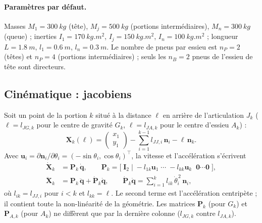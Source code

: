 \documentclass[11pt,a4paper]{article}
\newcommand{\vect}[1]{\bm{#1}}
\newcommand{\mat}[1]{\bm{#1}}
\newcommand{\T}{^{\!\top}}
\newcommand{\dt}[1]{\dot{#1}}
\newcommand{\ddt}[1]{\ddot{#1}}
\newcommand{\q}{\vect{q}}
\begin{document}
\paragraph{Paramètres par défaut.} Masses $M_1=\SI{300}{kg}$ (tête), $M_j=\SI{500}{kg}$ (portions intermédiaires), $M_n=\SI{300}{kg}$ (queue) ; inerties $I_1=\SI{170}{kg.m^2}$, $I_j=\SI{150}{kg.m^2}$, $I_n=\SI{100}{kg.m^2}$ ; longueur $L=\SI{1,8}{m}$, $l_1=\SI{0,6}{m}$, $l_n=\SI{0,3}{m}$. Le nombre de pneus par essieu est $n_P=2$ (têtes) et $n_P=4$ (portions intermédiaires) ; seuls les $n_B=2$ pneus de l'essieu de tête sont directeurs.

\subsection{Cinématique : jacobiens}\label{sec:jac}
Soit un point de la portion $k$ situé à la distance $\ell$ en arrière de l'articulation $J_k$ ($\ell=l_{JG,k}$ pour le centre de gravité $G_k$, $\ell=l_{JA,k}$ pour le centre d'essieu $A_k$) :
\begin{equation}
 \vect X_k(\ell)=\begin{pmatrix}x_1\\y_1\end{pmatrix}-\sum_{i=1}^{k-1}l_{JJ,i}\,\vect n_i-\ell\,\vect n_k .
\end{equation}
Avec $\vect u_i=\partial\vect n_i/\partial\theta_i=(-\sin\theta_i,\cos\theta_i)\T$, la vitesse et l'accélération s'écrivent
\begin{align}
 \dt{\vect X}_k&=\mat P_k\,\dt\q,\qquad
 \mat P_k=\Big[\;\mat I_2\;\Big|\;-l_{1k}\vect u_1\;\cdots\;-l_{kk}\vect u_k\;\;\vect 0\cdots\vect 0\;\Big],\\
 \ddt{\vect X}_k&=\mat P_k\,\ddt\q+\dt{\mat P}_k\dt\q,\qquad
 \dt{\mat P}_k\dt\q=\sum_{i=1}^{k}l_{ik}\,\dt\theta_i^{\,2}\,\vect n_i ,
\end{align}
où $l_{ik}=l_{JJ,i}$ pour $i<k$ et $l_{kk}=\ell$. Le second terme est l'accélération centripète ; il contient toute la non-linéarité de la géométrie. Les matrices $\mat P_k$ (pour $G_k$) et $\mat P_{A,k}$ (pour $A_k$) ne diffèrent que par la dernière colonne ($l_{JG,k}$ contre $l_{JA,k}$).
\end{document}
